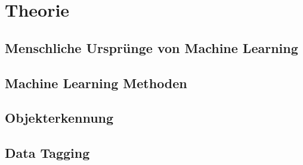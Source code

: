 \section{Theorie}



\subsection{Menschliche Ursprünge von Machine Learning}

\subsection{Machine Learning Methoden}
\subsection{Objekterkennung}
\subsection{Data Tagging}


